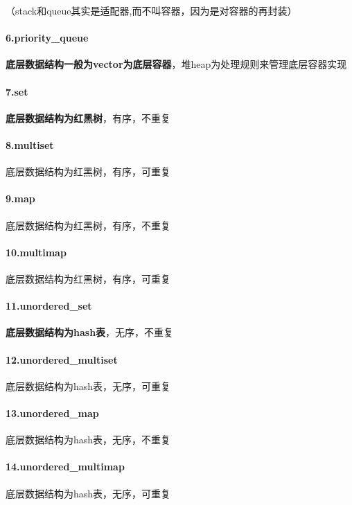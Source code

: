 \documentclass[UTF8,a4paper,12pt]{ctexbook}
\begin{document}
		 	（stack和queue其实是适配器,而不叫容器，因为是对容器的再封装）
		 
		 \paragraph{6.priority\_queue}     
		 	\textbf{底层数据结构一般为vector为底层容器}，堆heap为处理规则来管理底层容器实现
		 
		 \paragraph{7.set }            
		 	\textbf{ 底层数据结构为红黑树}，有序，不重复
		 
		 \paragraph{8.multiset}         
		 	底层数据结构为红黑树，有序，可重复 
		 
		 \paragraph{9.map }               
		 	底层数据结构为红黑树，有序，不重复
		 
		 \paragraph{10.multimap}    
		 	底层数据结构为红黑树，有序，可重复
		 
		 \paragraph{11.unordered\_set }    
		 	\textbf{底层数据结构为hash表}，无序，不重复
		 
		 \paragraph{12.unordered\_multiset} 
		 	底层数据结构为hash表，无序，可重复 
		 
		 \paragraph{13.unordered\_map}    
		 	底层数据结构为hash表，无序，不重复
		 
		 \paragraph{14.unordered\_multimap} 
		 	底层数据结构为hash表，无序，可重复  
		 	
\end{document}
